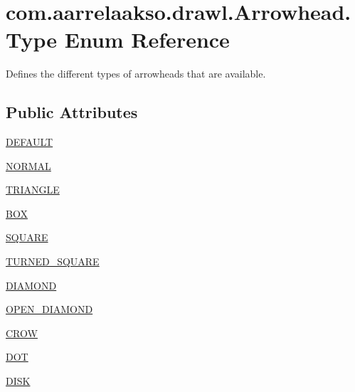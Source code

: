 \hypertarget{enumcom_1_1aarrelaakso_1_1drawl_1_1_arrowhead_1_1_type}{}\section{com.\+aarrelaakso.\+drawl.\+Arrowhead.\+Type Enum Reference}
\label{enumcom_1_1aarrelaakso_1_1drawl_1_1_arrowhead_1_1_type}


Defines the different types of arrowheads that are available.  


\subsection*{Public Attributes}
\begin{DoxyCompactItemize}
\item 
\hyperlink{enumcom_1_1aarrelaakso_1_1drawl_1_1_arrowhead_1_1_type_ae4c70d3cd0853637fba791f2bb29cd8e}{D\+E\+F\+A\+U\+LT}
\item 
\hyperlink{enumcom_1_1aarrelaakso_1_1drawl_1_1_arrowhead_1_1_type_abd0879a22002109b53e3d6af939c0734}{N\+O\+R\+M\+AL}
\item 
\hyperlink{enumcom_1_1aarrelaakso_1_1drawl_1_1_arrowhead_1_1_type_a84bfc9a808825452b04017d73f63f99e}{T\+R\+I\+A\+N\+G\+LE}
\item 
\hyperlink{enumcom_1_1aarrelaakso_1_1drawl_1_1_arrowhead_1_1_type_a823c7c75a5a70ecf72ee123eb4bec04f}{B\+OX}
\item 
\hyperlink{enumcom_1_1aarrelaakso_1_1drawl_1_1_arrowhead_1_1_type_a39ad0ea537ea80479c845425c4643abf}{S\+Q\+U\+A\+RE}
\item 
\hyperlink{enumcom_1_1aarrelaakso_1_1drawl_1_1_arrowhead_1_1_type_a463ab7af648a68ee790781ab09c04b49}{T\+U\+R\+N\+E\+D\+\_\+\+S\+Q\+U\+A\+RE}
\item 
\hyperlink{enumcom_1_1aarrelaakso_1_1drawl_1_1_arrowhead_1_1_type_a038817b0bde4231adfc55dd4f507df5c}{D\+I\+A\+M\+O\+ND}
\item 
\hyperlink{enumcom_1_1aarrelaakso_1_1drawl_1_1_arrowhead_1_1_type_a7bedad9291c6683881dbcdfdc4370035}{O\+P\+E\+N\+\_\+\+D\+I\+A\+M\+O\+ND}
\item 
\hyperlink{enumcom_1_1aarrelaakso_1_1drawl_1_1_arrowhead_1_1_type_af2ade96c668c81e82484da17f28ccf13}{C\+R\+OW}
\item 
\hyperlink{enumcom_1_1aarrelaakso_1_1drawl_1_1_arrowhead_1_1_type_ad1e2ede480af8de60271d06f2eeff6ca}{D\+OT}
\item 
\hyperlink{enumcom_1_1aarrelaakso_1_1drawl_1_1_arrowhead_1_1_type_a474091c67ecdac839f2402301a46dc5d}{D\+I\+SK}

\end{DoxyCompactItemize}
